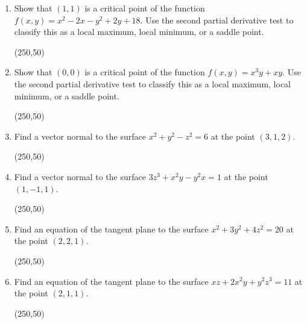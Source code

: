 \documentclass[12pt]{article}
\begin{document}
\begin{enumerate}[label=\arabic*.,start=2,leftmargin=*,itemsep=0pt]
\vfill
\begin{flushright}
\framebox(250,50){}
\end{flushright}

\newpage

\item Show that $(1,1)$ is a critical point of the function
$f(x,y)=x^2-2x-y^2+2y+18$. Use the second partial derivative test to classify
this as a local maximum, local minimum, or a saddle point.

\vfill
\begin{flushright}
\framebox(250,50){}
\end{flushright}

\item Show that $(0,0)$ is a critical point of the function
$f(x,y)=x^3y+xy$. Use the second partial derivative test to classify this as a
local maximum, local minimum, or a saddle point.

\vfill
\begin{flushright}
\framebox(250,50){}
\end{flushright}

\newpage

\item Find a vector normal to the surface $x^2+y^2-z^2=6$ at the point
$(3,1,2)$.

\vfill
\begin{flushright}
\framebox(250,50){}
\end{flushright}

\item Find a vector normal to the surface $3z^3+x^2y-y^2x=1$ at the point
$(1,-1,1)$.

\vfill
\begin{flushright}
\framebox(250,50){}
\end{flushright}

\newpage

\item Find an equation of the tangent plane to the surface
$x^2+3y^2+4z^2=20$ at the point $(2,2,1)$.

\vfill
\begin{flushright}
\framebox(250,50){}
\end{flushright}

\item Find an equation of the tangent plane to the surface
$xz+2x^2y+y^2z^3=11$ at the point $(2,1,1)$.

\vfill
\begin{flushright}
\framebox(250,50){}
\end{flushright}

\end{enumerate}
\end{document}
